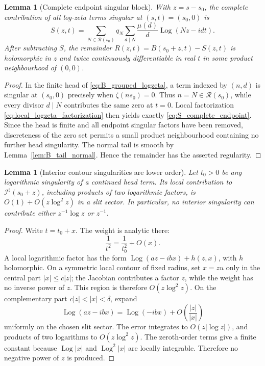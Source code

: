 \documentclass[11pt]{amsart}
\numberwithin{equation}{section}
\theoremstyle{plain}
\newtheorem{lemma}[theorem]{Lemma}
\theoremstyle{definition}
\theoremstyle{remark}
\newcommand{\Log}{\operatorname{Log}}
\begin{document}
\begin{lemma}[Complete endpoint singular block]
\label{lem:complete_endpoint_block}
With \(z=s-s_0\), the complete contribution of all log-zeta terms singular
at \((s,t)=(s_0,0)\) is
\begin{equation}
S(z,t)
=
\sum_{N\in\mathcal R(s_0)}q_N
\sum_{d\mid N}\frac{\mu(d)}d
\Log(Nz-idt).
\label{eq:S_complete_endpoint}
\end{equation}
After subtracting \(S\), the remainder \(R(z,t)=B(s_0+z,t)-S(z,t)\) is
holomorphic in \(z\) and twice continuously differentiable in real \(t\) in
some product neighbourhood of \((0,0)\).
\end{lemma}

\begin{proof}
In the finite head of \eqref{eq:B_grouped_logzeta}, a term indexed by
\((n,d)\) is singular at \((s_0,0)\) precisely when \(\zeta(ns_0)=0\).
Thus \(n=N\in\mathcal R(s_0)\), while every divisor \(d\mid N\) contributes
the same zero at \(t=0\).  Local factorization
\eqref{eq:local_logzeta_factorization} then yields exactly
\eqref{eq:S_complete_endpoint}.  Since the head is finite and all endpoint
singular factors have been removed, discreteness of the zero set permits a
small product neighbourhood containing no further head singularity.  The
normal tail is smooth by Lemma~\ref{lem:B_tail_normal}.  Hence the remainder
has the asserted regularity.
\end{proof}

\begin{lemma}[Interior contour singularities are lower order]
\label{lem:interior_lower_order}
Let \(t_0>0\) be any logarithmic singularity of a continued head term.  Its
local contribution to \(\mathcal I^\sharp(s_0+z)\), including products of
two logarithmic factors, is \(O(1)+O(z\log^2 z)\) in a slit sector.  In
particular, no interior singularity can contribute either
\(z^{-1}\log z\) or \(z^{-1}\).
\end{lemma}

\begin{proof}
Write \(t=t_0+x\).  The weight is analytic there:
\begin{equation}
\frac1{t^2}=\frac1{t_0^2}+O(x).
\label{eq:t0_weight_expansion}
\end{equation}
A local logarithmic factor has the form
\(\Log(az-ibx)+h(z,x)\), with \(h\) holomorphic.  On a symmetric local
contour of fixed radius, set \(x=zu\) only in the central part
\(|x|\le c|z|\); the Jacobian contributes a factor \(z\), while the weight
has no inverse power of \(z\).  This region is therefore
\(O(z\log^2 z)\).  On the complementary part \(c|z|<|x|<\delta\), expand
\begin{equation}
\Log(az-ibx)
=
\Log(-ibx)+O\!\left(\frac{|z|}{|x|}\right)
\label{eq:interior_log_expansion}
\end{equation}
uniformly on the chosen slit sector.  The error integrates to
\(O(z|\log z|)\), and products of two logarithms to
\(O(z\log^2 z)\).  The zeroth-order terms give a finite constant because
\(\Log|x|\) and \(\Log^2|x|\) are locally integrable.  Therefore no negative
power of \(z\) is produced.
\end{proof}
\end{document}
